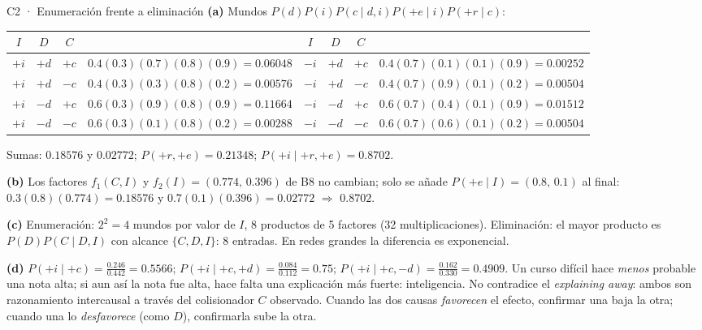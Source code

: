\begin{solucion}{C2 · Enumeración frente a eliminación}
\textbf{(a)} Mundos $P(d)P(i)P(c\mid d,i)P(+e\mid i)P(+r\mid c)$:
\begin{center}\small
\begin{tabular}{ccc|l@{\qquad}ccc|l}
$I$&$D$&$C$& & $I$&$D$&$C$& \\\hline
$+i$&$+d$&$+c$& $0.4(0.3)(0.7)(0.8)(0.9)=0.06048$ & $-i$&$+d$&$+c$& $0.4(0.7)(0.1)(0.1)(0.9)=0.00252$\\
$+i$&$+d$&$-c$& $0.4(0.3)(0.3)(0.8)(0.2)=0.00576$ & $-i$&$+d$&$-c$& $0.4(0.7)(0.9)(0.1)(0.2)=0.00504$\\
$+i$&$-d$&$+c$& $0.6(0.3)(0.9)(0.8)(0.9)=0.11664$ & $-i$&$-d$&$+c$& $0.6(0.7)(0.4)(0.1)(0.9)=0.01512$\\
$+i$&$-d$&$-c$& $0.6(0.3)(0.1)(0.8)(0.2)=0.00288$ & $-i$&$-d$&$-c$& $0.6(0.7)(0.6)(0.1)(0.2)=0.00504$
\end{tabular}
\end{center}
Sumas: $0.18576$ y $0.02772$; $P(+r,+e)=0.21348$; $P(+i\mid+r,+e)=\mathbf{0.8702}$.

\textbf{(b)} Los factores $f_1(C,I)$ y $f_2(I)=(0.774,\,0.396)$ de B8 no cambian; solo se añade $P(+e\mid I)=(0.8,\,0.1)$ al final:
$0.3(0.8)(0.774)=0.18576$ y $0.7(0.1)(0.396)=0.02772$ $\Rightarrow$ $\mathbf{0.8702}$.

\textbf{(c)} Enumeración: $2^2=4$ mundos por valor de $I$, 8 productos de 5 factores (32 multiplicaciones). Eliminación: el mayor producto es
$P(D)P(C\mid D,I)$ con alcance $\{C,D,I\}$: 8 entradas. En redes grandes la diferencia es exponencial.

\textbf{(d)} $P(+i\mid+c)=\frac{0.246}{0.442}=\mathbf{0.5566}$; $P(+i\mid+c,+d)=\frac{0.084}{0.112}=\mathbf{0.75}$; $P(+i\mid+c,-d)=\frac{0.162}{0.330}=\mathbf{0.4909}$.
Un curso difícil hace \emph{menos} probable una nota alta; si aun así la nota fue alta, hace falta una explicación más fuerte: inteligencia.
No contradice el \emph{explaining away}: ambos son razonamiento intercausal a través del colisionador $C$ observado. Cuando las dos causas
\emph{favorecen} el efecto, confirmar una baja la otra; cuando una lo \emph{desfavorece} (como $D$), confirmarla sube la otra.
\end{solucion}


